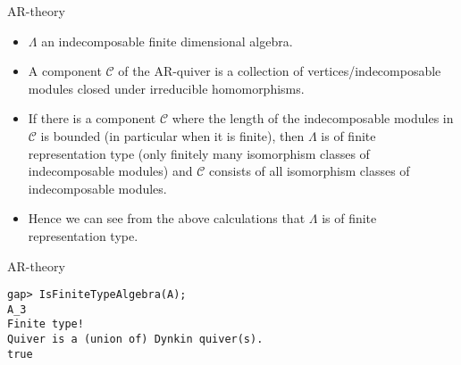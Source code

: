 \begin{frame}[fragile]{AR-theory}
\begin{itemize}
\item $\Lambda$ an indecomposable finite dimensional algebra. 
\item A component $\mathcal{C}$ of the AR-quiver is a collection of
  vertices/indecomposable modules closed under irreducible
  homomorphisms.
\item If there is a component $\mathcal{C}$ where the length of the
  indecomposable modules in $\mathcal{C}$ is bounded (in particular
  when it is finite), then $\Lambda$ is of finite representation type
  (only finitely many isomorphism classes of indecomposable modules)
  and $\mathcal{C}$ consists of all isomorphism classes of
  indecomposable modules.  
\item Hence we can see from the above calculations that $\Lambda$ is
  of finite representation type.
\end{itemize}
\end{frame}

\begin{frame}[fragile]{AR-theory}
\begin{verbatim}
gap> IsFiniteTypeAlgebra(A);
A_3
Finite type!
Quiver is a (union of) Dynkin quiver(s).
true
\end{verbatim}
\end{frame}

